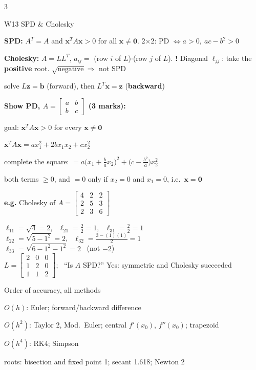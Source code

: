 \documentclass[8pt,a4paper]{extarticle}
\newcommand{\hd}[1]{\par\vspace{3pt}\noindent\colorbox{accent}{\parbox{\dimexpr\linewidth-2\fboxsep}{\color{white}\bfseries\strut #1}}\par\vspace{1pt}}
\newcommand{\sub}[1]{\textbf{\color{accent}#1}}
\newcommand{\warn}[1]{{\color{red}\textbf{!} #1}}
\newenvironment{ex}[1]{\par\vspace{2pt}\noindent\begin{lrbox}{\exbox}\begin{minipage}{\dimexpr\linewidth-2\fboxsep}\RaggedRight\color{grn}\textbf{e.g.} #1\par\setlength{\parskip}{1.5pt}}{\end{minipage}\end{lrbox}\colorbox{exbg}{\usebox{\exbox}}\par\vspace{1pt}}
\begin{document}
\begin{multicols*}{3}
\hd{W13 SPD \& Cholesky}
\begin{tl}
\item \sub{SPD:} $A^T=A$ and $\mathbf x^TA\mathbf x>0$ for all $\mathbf x\ne\mathbf0$. 2$\times$2: PD $\iff a>0,\ ac-b^2>0$
\item \sub{Cholesky:} $A=LL^T$, $a_{ij}=$ (row $i$ of $L$)$\cdot$(row $j$ of $L$). \warn{Diagonal $\ell_{jj}$: take the \textbf{positive} root.} $\sqrt{\text{negative}}\Rightarrow$ not SPD
\item solve $L\mathbf z=\mathbf b$ (forward), then $L^T\mathbf x=\mathbf z$ (\textbf{backward})
\end{tl}
\sub{Show PD, $A=\begin{bmatrix}a&b\\b&c\end{bmatrix}$ (3 marks):}
\begin{der}
\item goal: $\mathbf x^TA\mathbf x>0$ for every $\mathbf x\ne\mathbf0$
\item $\mathbf x^TA\mathbf x=ax_1^2+2bx_1x_2+cx_2^2$
\item complete the square: $=a\big(x_1+\frac bax_2\big)^2+\big(c-\frac{b^2}a\big)x_2^2$
\item both terms $\ge0$, and $=0$ only if $x_2=0$ and $x_1=0$, i.e.\ $\mathbf x=\mathbf0$
\end{der}
\begin{ex}{Cholesky of $A=\begin{bmatrix}4&2&2\\2&5&3\\2&3&6\end{bmatrix}$}
$\ell_{11}=\sqrt4=2$, \ $\ell_{21}=\frac22=1$, \ $\ell_{31}=\frac22=1$\\
$\ell_{22}=\sqrt{5-1^2}=2$, \ $\ell_{32}=\frac{3-(1)(1)}{2}=1$\\
$\ell_{33}=\sqrt{6-1^2-1^2}=2$ \ (not $-2$)\\
$L=\begin{bmatrix}2&0&0\\1&2&0\\1&1&2\end{bmatrix}$; \ ``Is $A$ SPD?'' Yes: symmetric and Cholesky succeeded
\end{ex}

\hd{Order of accuracy, all methods}
\begin{tl}
\item $O(h)$: Euler; forward/backward difference
\item $O(h^2)$: Taylor 2, Mod.\ Euler; central $f'(x_0)$, $f''(x_0)$; trapezoid
\item $O(h^4)$: RK4; Simpson
\item roots: bisection and fixed point 1; secant 1.618; Newton 2
\end{tl}

\end{multicols*}
\end{document}
